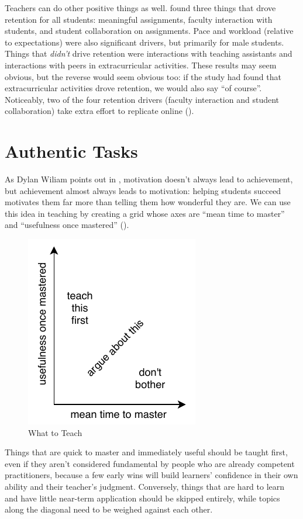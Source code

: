 Teachers can do other positive things as well.  \cite{Bark2014} found
three things that drove retention for all students: meaningful
assignments, faculty interaction with students, and student
collaboration on assignments.  Pace and workload (relative to
expectations) were also significant drivers, but primarily for male
students.  Things that \emph{didn't} drive retention were interactions
with teaching assistants and interactions with peers in
extracurricular activities.  These results may seem obvious, but the
reverse would seem obvious too: if the study had found that
extracurricular activities drove retention, we would also say ``of
course''.  Noticeably, two of the four retention drivers (faculty
interaction and student collaboration) take extra effort to replicate
online ().

\section{Authentic Tasks}\label{s:motivation-authentic}

As Dylan Wiliam points out in \cite{Hend2017}, motivation doesn't
always lead to achievement, but achievement almost always leads to
motivation: helping students succeed motivates them far more than
telling them how wonderful they are.  We can use this idea in teaching
by creating a grid whose axes are ``mean time to master'' and
``usefulness once mastered'' ().

\begin{figure}
\centering
\includegraphics{../docs/fig/what-to-teach.pdf}
\caption{What to Teach}
\label{f:motivation-what}
\end{figure}

Things that are quick to master and immediately useful should be
taught first, even if they aren't considered fundamental by people who
are already competent practitioners, because a few early wins will
build learners' confidence in their own ability and their teacher's
judgment.  Conversely, things that are hard to learn and have little
near-term application should be skipped entirely, while topics along
the diagonal need to be weighed against each other.

